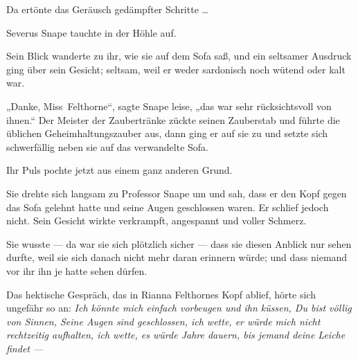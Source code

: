 Da ertönte das Geräusch gedämpfter Schritte …

Severus Snape tauchte in der Höhle auf.

Sein Blick wanderte zu ihr, wie sie auf dem Sofa saß, und ein seltsamer Ausdruck ging über sein Gesicht; seltsam, weil er weder sardonisch noch wütend oder kalt war.

„Danke, Miss~Felthorne“, sagte Snape leise, „das war sehr rücksichtsvoll von ihnen.“ Der Meister der Zaubertränke zückte seinen Zauberstab und führte die üblichen Geheimhaltungszauber aus, dann ging er auf sie zu und setzte sich schwerfällig neben sie auf das verwandelte Sofa.

Ihr Puls pochte jetzt aus einem ganz anderen Grund.

Sie drehte sich langsam zu Professor Snape um und sah, dass er den Kopf gegen das Sofa gelehnt hatte und seine Augen geschlossen waren. Er schlief jedoch nicht. Sein Gesicht wirkte verkrampft, angespannt und voller Schmerz.

Sie wusste — da war sie sich plötzlich sicher — dass sie diesen Anblick nur sehen durfte, weil sie sich danach nicht mehr daran erinnern würde; und dass niemand vor ihr ihn je hatte sehen dürfen.

Das hektische Gespräch, das in Rianna Felthornes Kopf ablief, hörte sich ungefähr so an: \emph{Ich könnte mich einfach vorbeugen und ihn küssen, Du bist völlig von Sinnen, Seine Augen sind geschlossen, ich wette, er würde mich nicht rechtzeitig aufhalten, ich wette, es würde Jahre dauern, bis jemand deine Leiche findet —}

